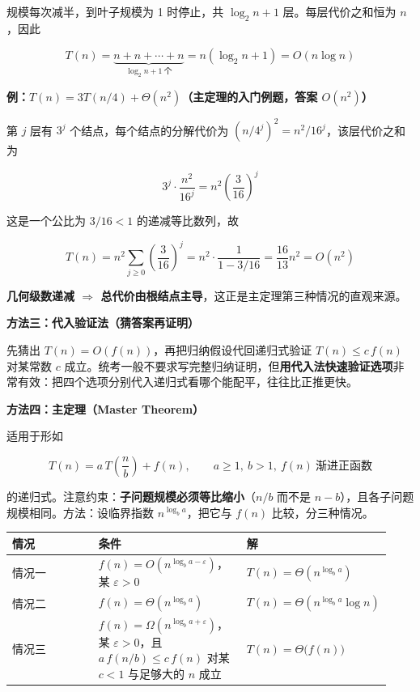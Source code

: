 \documentclass[11pt,openany,UTF8]{ctexbook}
\begin{document}
规模每次减半，到叶子规模为 1 时停止，共 $\log_2 n + 1$ 层。每层代价之和恒为 $n$，因此

\[T(n)=\underbrace{n+n+\cdots+n}_{\log_2 n+1\ \text{个}}=n(\log_2 n+1)=O(n\log n)\]

\textbf{例：$T(n)=3T(n/4)+\Theta(n^2)$（主定理的入门例题，答案 $O(n^2)$）}

第 $j$ 层有 $3^j$ 个结点，每个结点的分解代价为 $(n/4^j)^2 = n^2/16^j$，该层代价之和为

\[3^j \cdot \frac{n^2}{16^j}=n^2\left(\frac{3}{16}\right)^j\]

这是一个公比为 $3/16<1$ 的递减等比数列，故

\[T(n)=n^2\sum_{j\ge 0}\left(\frac{3}{16}\right)^j=n^2\cdot\frac{1}{1-3/16}=\frac{16}{13}n^2=O(n^2)\]

\textbf{几何级数递减 $\Rightarrow$ 总代价由根结点主导}，这正是主定理第三种情况的直观来源。

\textbf{方法三：代入验证法（猜答案再证明）}

先猜出 $T(n)=O(f(n))$，再把归纳假设代回递归式验证 $T(n)\le c\,f(n)$ 对某常数 $c$ 成立。统考一般不要求写完整归纳证明，但\textbf{用代入法快速验证选项}非常有效：把四个选项分别代入递归式看哪个能配平，往往比正推更快。

\textbf{方法四：主定理（Master Theorem）}

适用于形如

\[T(n)=a\,T\!\left(\frac{n}{b}\right)+f(n),\qquad a\ge 1,\ b>1,\ f(n)\ \text{渐进正函数}\]

的递归式。注意约束：\textbf{子问题规模必须等比缩小}（$n/b$ 而不是 $n-b$），且各子问题规模相同。方法：设临界指数 $n^{\log_b a}$，把它与 $f(n)$ 比较，分三种情况。

\begingroup\small\setlength{\tabcolsep}{4.0pt}
\begin{longtable}{@{}L{0.2606\linewidth}L{0.4072\linewidth}L{0.2606\linewidth}@{}}
\toprule
\textbf{情况} & \textbf{条件} & \textbf{解} \\
\midrule
\endhead
情况一 & $f(n)=O\!\left(n^{\log_b a-\varepsilon}\right)$，某 $\varepsilon>0$ & $T(n)=\Theta\!\left(n^{\log_b a}\right)$ \\
情况二 & $f(n)=\Theta\!\left(n^{\log_b a}\right)$ & $T(n)=\Theta\!\left(n^{\log_b a}\log n\right)$ \\
情况三 & $f(n)=\Omega\!\left(n^{\log_b a+\varepsilon}\right)$，某 $\varepsilon>0$，且 $a\,f(n/b)\le c\,f(n)$ 对某 $c<1$ 与足够大的 $n$ 成立 & $T(n)=\Theta\big(f(n)\big)$ \\
\bottomrule
\end{longtable}
\endgroup
\end{document}

